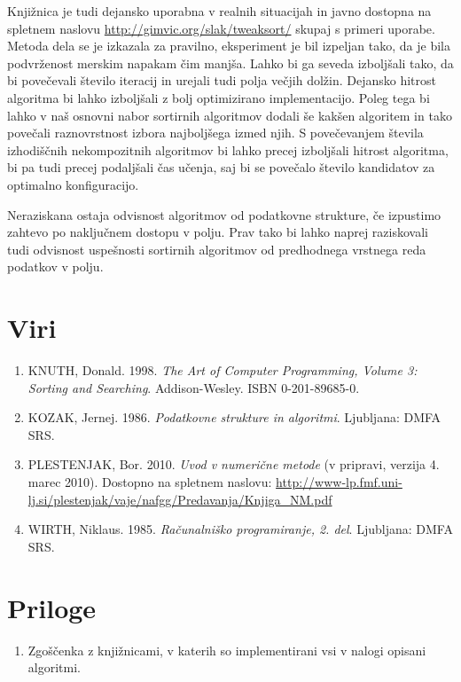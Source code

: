 \documentclass[a4paper,oneside,12pt]{article}
\begin{document}
Knjižnica je tudi dejansko uporabna v realnih situacijah in javno dostopna na spletnem
naslovu \url{http://gimvic.org/slak/tweaksort/} skupaj s primeri uporabe.
Metoda dela se je izkazala za pravilno, eksperiment je bil izpeljan tako,
da je bila podvrženost merskim napakam čim manjša. Lahko bi ga seveda 
izboljšali tako, da bi povečevali število iteracij in urejali tudi 
polja večjih dolžin. Dejansko hitrost algoritma bi lahko izboljšali z bolj
optimizirano implementacijo. Poleg tega bi lahko v naš osnovni nabor sortirnih
algoritmov dodali še kakšen algoritem in tako povečali raznovrstnost izbora
najboljšega izmed njih. S povečevanjem števila izhodiščnih nekompozitnih
algoritmov bi lahko precej izboljšali hitrost algoritma, bi pa tudi precej
podaljšali čas učenja, saj bi se povečalo število kandidatov za optimalno
konfiguracijo.

Neraziskana ostaja odvisnost algoritmov od podatkovne 
strukture, če izpustimo zahtevo po naključnem dostopu v polju. Prav tako
bi lahko naprej raziskovali tudi odvisnost uspešnosti sortirnih algoritmov 
od predhodnega vrstnega reda podatkov v polju.
\pagebreak

\section{Viri}
\begin{enumerate}
  \item KNUTH, Donald. 1998. \emph{The Art of Computer Programming, Volume 3: Sorting and
    Searching}. Addison-Wesley. ISBN 0-201-89685-0.
  \item KOZAK, Jernej. 1986. \emph{Podatkovne strukture in algoritmi}. Ljubljana: DMFA SRS.
  \item PLESTENJAK, Bor. 2010. \emph{Uvod v numerične
    metode} (v pripravi, verzija 4. marec 2010).
    Dostopno na spletnem naslovu: \url{http://www-lp.fmf.uni-lj.si/plestenjak/vaje/nafgg/Predavanja/Knjiga_NM.pdf}
  \item WIRTH, Niklaus. 1985. \emph{Računalniško programiranje, 2. del}. Ljubljana: DMFA SRS.
\end{enumerate}
\pagebreak

\section{Priloge}
\begin{enumerate}
  \item \label{pril:koda} Zgoščenka z knjižnicami, v katerih so implementirani
    vsi v nalogi opisani algoritmi.
\end{enumerate}
\end{document}
